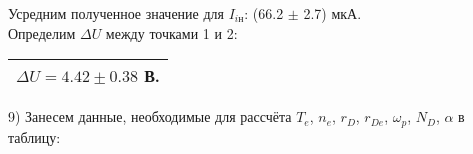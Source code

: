 \documentclass[a4paper,12pt]{article}
\begin{document}
Усредним полученное значение для $I_{i\text{н}}$: (66.2 $\pm$ 2.7) мкА. \\

Определим $\Delta U$ между точками 1 и 2: \begin{tabular}{|c|} \hline $\Delta U = 4.42 \pm 0.38$ В.\\ \hline \end{tabular}


\par9) Занесем данные, необходимые для рассчёта $T_e$, $n_e$, $r_D$, $r_{De}$, ${\omega}_p$, $N_D$, $\alpha$ в таблицу:\\

\begin{center}
\begin{tabular}{|c|c|c|c|}
	\hline
\end{tabular}
\end{center}
\end{document}
